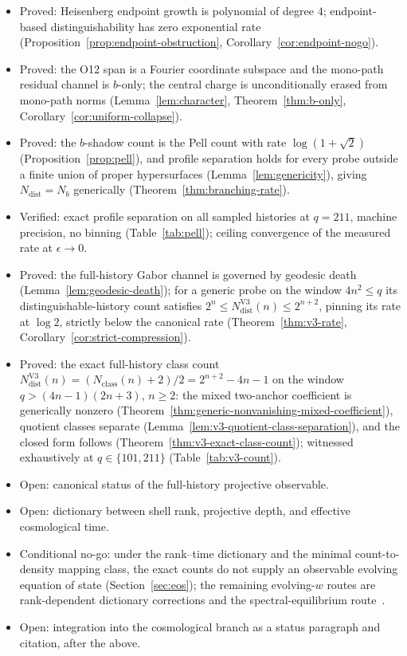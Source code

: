 \documentclass[11pt]{article}
\newcommand{\Ndist}{N_{\mathrm{dist}}}
\newcommand{\Nb}{N_b}
\newcommand{\NdistV}{N^{\mathrm{V3}}_{\mathrm{dist}}}
\newcommand{\Nclass}{N_{\mathrm{class}}}
\begin{document}
\begin{itemize}
\item Proved: Heisenberg endpoint growth is polynomial of degree $4$; endpoint-based distinguishability has
zero exponential rate (Proposition~\ref{prop:endpoint-obstruction}, Corollary~\ref{cor:endpoint-nogo}).
\item Proved: the O12 span is a Fourier coordinate subspace and the mono-path residual channel is $b$-only;
the central charge is unconditionally erased from mono-path norms (Lemma~\ref{lem:character},
Theorem~\ref{thm:b-only}, Corollary~\ref{cor:uniform-collapse}).
\item Proved: the $b$-shadow count is the Pell count with rate $\log(1+\sqrt2)$
(Proposition~\ref{prop:pell}), and profile separation holds for every probe outside a finite union of proper
hypersurfaces (Lemma~\ref{lem:genericity}), giving $\Ndist=\Nb$ generically
(Theorem~\ref{thm:branching-rate}).
\item Verified: exact profile separation on all sampled histories at $q=211$, machine precision, no binning
(Table~\ref{tab:pell}); ceiling convergence of the measured rate at $\epsilon\to0$.
\item Proved: the full-history Gabor channel is governed by geodesic death
(Lemma~\ref{lem:geodesic-death}); for a generic probe on the window $4n^2\le q$ its
distinguishable-history count satisfies $2^n\le\NdistV(n)\le2^{n+2}$, pinning its rate at $\log 2$,
strictly below the canonical rate (Theorem~\ref{thm:v3-rate}, Corollary~\ref{cor:strict-compression}).
\item Proved: the exact full-history class count $\NdistV(n)=(\Nclass(n)+2)/2=2^{n+2}-4n-1$ on the window
$q>(4n-1)(2n+3)$, $n\ge2$: the mixed two-anchor coefficient is generically nonzero
(Theorem~\ref{thm:generic-nonvanishing-mixed-coefficient}), quotient classes separate
(Lemma~\ref{lem:v3-quotient-class-separation}), and the closed form follows
(Theorem~\ref{thm:v3-exact-class-count}); witnessed exhaustively at $q\in\{101,211\}$
(Table~\ref{tab:v3-count}).
\item Open: canonical status of the full-history projective observable.
\item Open: dictionary between shell rank, projective depth, and effective cosmological time.
\item Conditional no-go: under the rank--time dictionary and the minimal count-to-density mapping class,
the exact counts do not supply an observable evolving equation of state (Section~\ref{sec:eos}); the
remaining evolving-$w$ routes are rank-dependent dictionary corrections and the spectral-equilibrium
route~\cite{Beau2026Thermodynamics}.
\item Open: integration into the cosmological branch as a status paragraph and citation, after the above.
\end{itemize}
\end{document}
